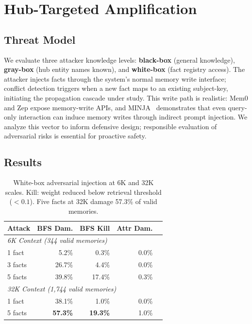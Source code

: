 \documentclass{article}
\begin{document}
\section{Hub-Targeted Amplification}
\label{sec:c3}

\subsection{Threat Model}

We evaluate three attacker knowledge levels: \textbf{black-box} (general knowledge), \textbf{gray-box} (hub entity names known), and \textbf{white-box} (fact registry access).
The attacker injects facts through the system's normal memory write interface; conflict detection triggers when a new fact maps to an existing subject-key, initiating the propagation cascade under study.
This write path is realistic: Mem0 and Zep expose memory-write APIs, and MINJA~\citep{minja_2025} demonstrates that even query-only interaction can induce memory writes through indirect prompt injection.
We analyze this vector to inform defensive design; responsible evaluation of adversarial risks is essential for proactive safety.

\subsection{Results}

\begin{table}[htbp]
\centering
\footnotesize
\begin{tabular}{lrrrr}
\toprule
\textbf{Attack} & \textbf{BFS Dam.} & \textbf{BFS Kill} & \textbf{Attr Dam.} \\
\midrule
\multicolumn{4}{l}{\textit{6K Context (344 valid memories)}} \\
1 fact & 5.2\% & 0.3\% & 0.0\% \\
3 facts & 26.7\% & 4.4\% & 0.0\% \\
5 facts & 39.8\% & 17.4\% & 0.3\% \\
\midrule
\multicolumn{4}{l}{\textit{32K Context (1,744 valid memories)}} \\
1 fact & 38.1\% & 1.0\% & 0.0\% \\
5 facts & \textbf{57.3\%} & \textbf{19.3\%} & 1.0\% \\
\bottomrule
\end{tabular}
\caption{White-box adversarial injection at 6K and 32K scales. Kill: weight reduced below retrieval threshold ($< 0.1$). Five facts at 32K damage 57.3\% of valid memories.}
\label{tab:adversarial}
\end{table}
\end{document}
